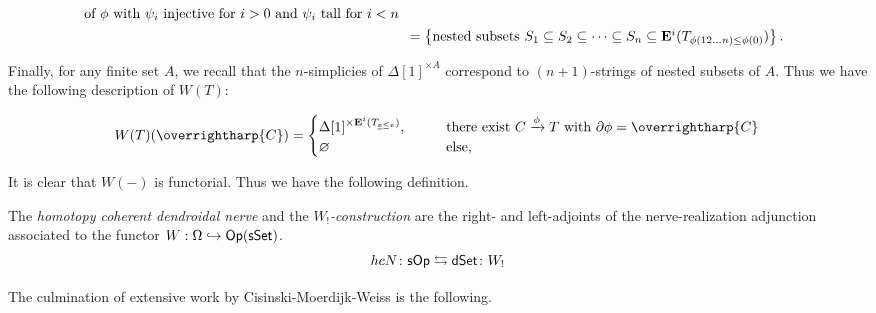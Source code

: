 \documentclass[a4paper,10pt
,draft
]{article}%
\renewcommand{\1}{\eta}%
\newcommand{\vect}[1]{\text{\overrightharp{\ensuremath{#1}}}}
\begin{document}
\begin{align*}
{\begin{array}{l}
      \\
      \mbox{of $\phi$ with $\psi_i$ injective for $i > 0$ and $\psi_i$ tall for $i < n$}
    \end{array}
  }
  \\
  &= \left\{\mbox{nested subsets $S_1 \subseteq S_2 \subseteq \dots \subseteq S_n \subseteq \mathbf E^i(T_{\phi(1 2 \dots n) \leq \phi(0)})$}\right\}.
\end{align*}

Finally, for any finite set $A$, we recall that the $n$-simplicies of $\Delta[1]^{\times A}$ correspond to $(n+1)$-strings of nested subsets of $A$.
Thus we have the following description of $W(T)$:

\begin{equation}
      \label{WT_EQ}
      W(T)(\vect C) = 
      \begin{cases}
            \Delta[1]^{\times \mathbf E^i(T_{\underline e \leq e})}, \qquad & \mbox{there exist $C \xrightarrow{\phi} T$ with $\partial \phi = \vect C$}
            \\
            \varnothing & \text{else,}
      \end{cases}
\end{equation}

It is clear that $W(-)$ is functorial. Thus we have the following definition.

\begin{definition}
      The \textit{homotopy coherent dendroidal nerve} and the \textit{$W_!$-construction}
      are the right- and left-adjoints of the nerve-realization adjunction associated to the functor $W: \Omega \hookrightarrow \mathsf{Op}(\mathsf{sSet})$.
      \begin{equation}
            \label{SOPDSET_EQ}
            hc N \colon \mathsf{sOp} \leftrightarrows
            \mathsf{dSet} \colon W_!
      \end{equation}
\end{definition}
The culmination of extensive work by Cisinski-Moerdijk-Weiss \cite{CM13a,CM13b,CM11,MW09,MW07} is the following.
\end{document}
